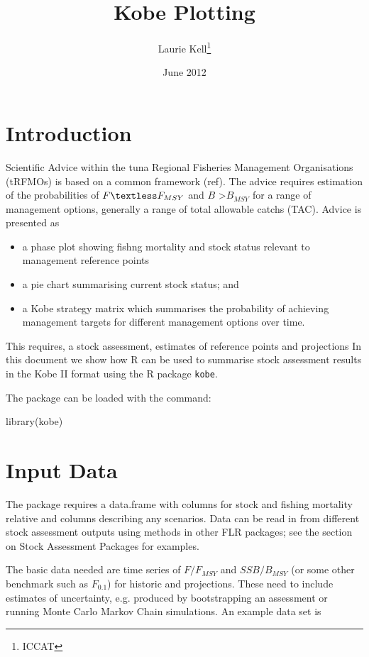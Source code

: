 \documentclass[a4paper, 11pt, oldtoc]{artikel1}
\begin{document}
\title{Kobe Plotting}
\author{Laurie Kell\footnote{ICCAT}}
\date{June 2012}
\maketitle
\tableofcontents


 
\section{Introduction}

Scientific Advice within the tuna Regional Fisheries Management Organisations (tRFMOs) is based on a common framework 
(ref). The advice requires estimation of the probabilities of $F \textless F_{MSY}$ and
$B$ \textgreater $B_{MSY}$ for a range of management options, generally a range of total allowable catchs (TAC). Advice is presented as 

\begin{itemize}
 \item a phase plot showing fishng mortality and stock status relevant to management reference points
 \item a pie chart summarising current stock status; and 
 \item a Kobe strategy matrix which summarises the probability of achieving management targets for different management options over time.
\end{itemize}

This requires, a stock assessment, estimates of reference points and projections
In this document we show how R can be used to summarise stock assessment results in the Kobe II format using the R package \texttt{kobe}. 

The package can be loaded with the command:

library(kobe)

\section{Input Data}

The package requires a data.frame with columns for stock and fishing mortality relative and columns describing
any scenarios. Data can be read in from different stock assessment outputs using methods 
in other FLR packages; see the section on Stock Assessment Packages for examples.

The basic data needed are time series of $F/F_{MSY}$ and $SSB/B_{MSY}$ (or some other benchmark such as $F_{0.1}$)
for historic and projections. These need to include estimates of uncertainty, e.g. produced by bootstrapping an
assessment or running Monte Carlo Markov Chain simulations. An example data set is
\end{document}

